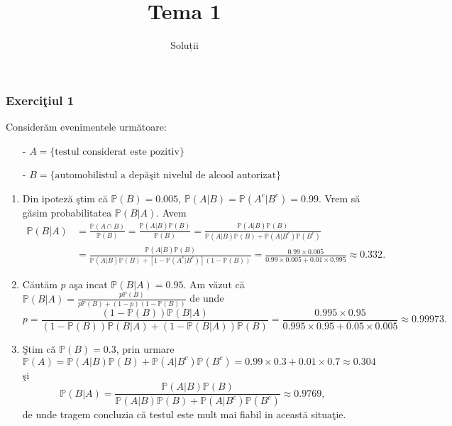 \documentclass[]{article}
\title{Tema 1}
\subtitle{Soluții}
\author{}
\date{}
\def\PP{{\mathbb P}}
\begin{document}
\maketitle

\thispagestyle{fancy}

\subsubsection{\texorpdfstring{Exerci\c tiul
1}{Exerciiul 1}}\label{exerciiul-1}

Consider\u am evenimentele urm\u atoare:

\begin{itemize}
  \item[-] $A=\{\mbox{testul considerat este pozitiv}\}$ 
  \item[-] $B=\{\mbox{automobilistul a dep\u a\c sit nivelul de alcool autorizat}\}$
\end{itemize}

\begin{enumerate}
    \item Din ipotez\u a \c stim c\u a $\PP(B) = 0.005$, $\PP(A|B) = \PP(A^c|B^c) = 0.99$. Vrem s\u a g\u asim probabilitatea $\PP(B|A)$. Avem
\begin{align*}
    \PP(B|A) &= \frac{\PP(A\cap B)}{\PP(B)} = \frac{\PP(A|B)\PP(B)}{\PP(B)} = \frac{\PP(A|B)\PP(B)}{\PP(A|B)\PP(B)+\PP(A|B^c)\PP(B^c)}\\
             &= \frac{\PP(A|B)\PP(B)}{\PP(A|B)\PP(B)+\left[1-\PP(A^c|B^c)\right](1-\PP(B))} = \frac{0.99\times0.005}{0.99\times0.005+0.01\times0.995} \approx 0.332.
\end{align*}
    \item C\u aut\u am $p$ a\c sa incat $\PP(B|A)=0.95$. Am v\u azut c\u a $\PP(B|A) = \frac{p\PP(B)}{p\PP(B)+(1-p)(1-\PP(B))}$ de unde
\begin{equation*}
    p = \frac{(1-\PP(B))\PP(B|A)}{(1-\PP(B))\PP(B|A)+(1-\PP(B|A))\PP(B)} = \frac{0.995\times0.95}{0.995\times0.95+0.05\times0.005}\approx0.99973.
\end{equation*}
    \item \c Stim c\u a $\PP(B)=0.3$, prin urmare $\PP(A) = \PP(A|B)\PP(B)+\PP(A|B^c)\PP(B^c) = 0.99\times0.3+0.01\times0.7\approx0.304$ \c si
\begin{equation*}
    \PP(B|A) = \frac{\PP(A|B)\PP(B)}{\PP(A|B)\PP(B)+\PP(A|B^c)\PP(B^c)}\approx 0.9769,
\end{equation*}
de unde tragem concluzia c\u a testul este mult mai fiabil in aceast\u a situa\c tie.
\end{enumerate}
\end{document}
